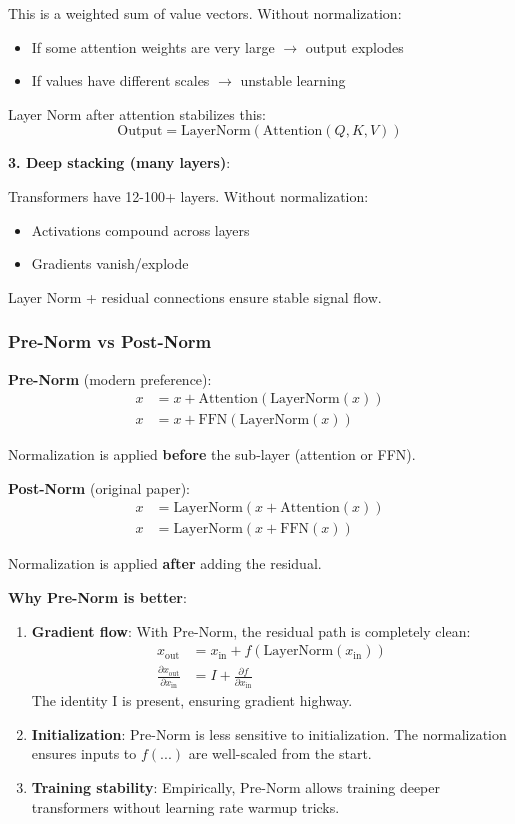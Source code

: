 This is a weighted sum of value vectors. Without normalization:
\begin{itemize}
\item If some attention weights are very large $\to$ output explodes
\item If values have different scales $\to$ unstable learning
\end{itemize}

Layer Norm after attention stabilizes this:
\[
\text{Output} = \text{LayerNorm}(\text{Attention}(Q, K, V))
\]

\textbf{3. Deep stacking (many layers)}:

Transformers have 12-100+ layers. Without normalization:
\begin{itemize}
\item Activations compound across layers
\item Gradients vanish/explode
\end{itemize}

Layer Norm + residual connections ensure stable signal flow.

\subsubsection{Pre-Norm vs Post-Norm}

\textbf{Pre-Norm} (modern preference):
\begin{align*}
x &= x + \text{Attention}(\text{LayerNorm}(x)) \\
x &= x + \text{FFN}(\text{LayerNorm}(x))
\end{align*}

Normalization is applied \textbf{before} the sub-layer (attention or FFN).

\textbf{Post-Norm} (original paper):
\begin{align*}
x &= \text{LayerNorm}(x + \text{Attention}(x)) \\
x &= \text{LayerNorm}(x + \text{FFN}(x))
\end{align*}

Normalization is applied \textbf{after} adding the residual.

\textbf{Why Pre-Norm is better}:

\begin{enumerate}
\item \textbf{Gradient flow}: With Pre-Norm, the residual path is completely clean:
\begin{align*}
x_{\text{out}} &= x_{\text{in}} + f(\text{LayerNorm}(x_{\text{in}})) \\
\frac{\partial x_{\text{out}}}{\partial x_{\text{in}}} &= I + \frac{\partial f}{\partial x_{\text{in}}}
\end{align*}
The identity I is present, ensuring gradient highway.

\item \textbf{Initialization}: Pre-Norm is less sensitive to initialization. The normalization ensures inputs to $f(...)$ are well-scaled from the start.

\item \textbf{Training stability}: Empirically, Pre-Norm allows training deeper transformers without learning rate warmup tricks.
\end{enumerate}

